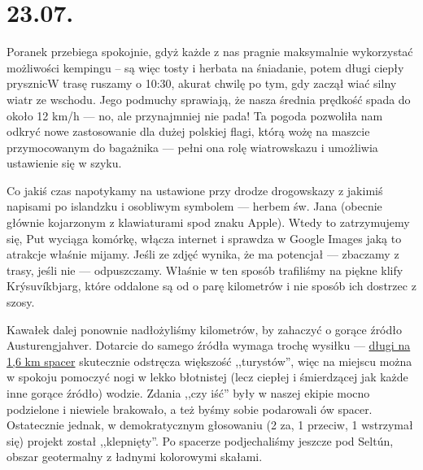 \chapter*{23.07.}

Poranek przebiega spokojnie, gdyż każde z nas pragnie maksymalnie wykorzystać możliwości kempingu -- są więc tosty i herbata na śniadanie, potem długi ciepły prysznic\textellipsis W trasę ruszamy o 10:30, akurat chwilę po tym, gdy zaczął wiać silny wiatr ze wschodu. Jego podmuchy sprawiają, że nasza średnia prędkość spada do około 12 km/h --- no, ale przynajmniej nie pada! Ta pogoda pozwoliła nam odkryć nowe zastosowanie dla dużej polskiej flagi, którą wożę na maszcie przymocowanym do bagażnika --- pełni ona rolę wiatrowskazu i umożliwia ustawienie się w szyku.


Co jakiś czas napotykamy na ustawione przy drodze drogowskazy z jakimiś napisami po islandzku i osobliwym symbolem --- herbem św. Jana (obecnie głównie kojarzonym z klawiaturami spod znaku Apple). Wtedy to zatrzymujemy się, Put wyciąga komórkę, włącza internet i sprawdza w Google Images jaką to atrakcje właśnie mijamy. Jeśli ze zdjęć wynika, że ma potencjał --- zbaczamy z trasy, jeśli nie --- odpuszczamy. Właśnie w ten sposób trafiliśmy na piękne klify Krýsuvíkbjarg, które oddalone są od  o parę kilometrów i nie sposób ich dostrzec z szosy.


Kawałek dalej ponownie nadłożyliśmy kilometrów, by zahaczyć o gorące źródło Austurengjahver. Dotarcie do samego źródła wymaga trochę wysiłku --- \href{http://www.openstreetmap.org/way/33182596}{długi na 1,6 km spacer} skutecznie odstręcza większość ,,turystów'', więc na miejscu można w spokoju pomoczyć nogi w lekko błotnistej (lecz ciepłej i śmierdzącej jak każde inne gorące źródło) wodzie. Zdania ,,czy iść'' były w naszej ekipie mocno podzielone i niewiele brakowało, a też byśmy sobie podarowali ów spacer. Ostatecznie jednak, w demokratycznym głosowaniu (2 za, 1 przeciw, 1 wstrzymał się) projekt został ,,klepnięty''. Po spacerze podjechaliśmy jeszcze pod Seltún, obszar geotermalny z ładnymi kolorowymi skałami.

